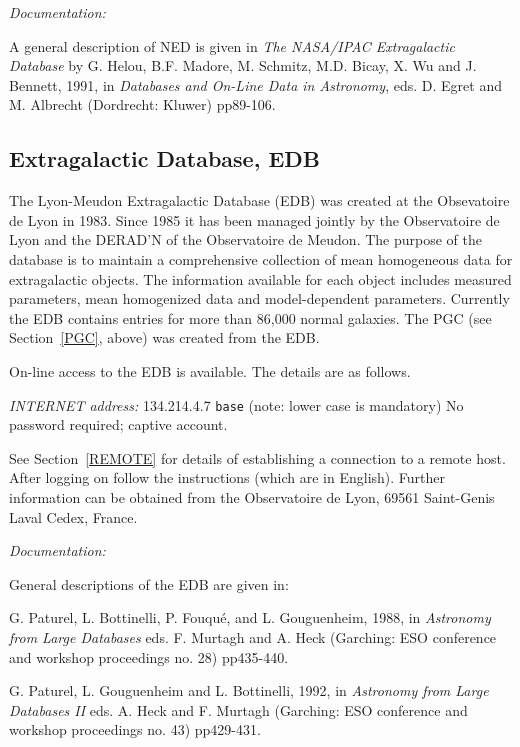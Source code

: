 {\it Documentation:}

A general description of NED is given in {\it The NASA/IPAC 
Extragalactic Database} by G. Helou, B.F. Madore, M. Schmitz, M.D. 
Bicay, X. Wu and J. Bennett, 1991, in {\it Databases and On-Line Data in
Astronomy}, eds. D. Egret and M. Albrecht (Dordrecht: Kluwer) pp89-106.

\subsection{Extragalactic Database, EDB
\label{EDB}}

The Lyon-Meudon Extragalactic Database (EDB) was created at the 
Obsevatoire de Lyon in 1983. Since 1985 it has been managed jointly by 
the Observatoire de Lyon and the DERAD'N of the Observatoire de Meudon.
The purpose of the database is to maintain a comprehensive collection
of mean homogeneous data for extragalactic objects. The information 
available for each object includes measured parameters, mean homogenized
data and model-dependent parameters. Currently the EDB contains entries
for more than 86,000 normal galaxies. The PGC (see Section~\ref{PGC},
above) was created from the EDB.

On-line access to the EDB is available. The details are as follows.

{\it INTERNET address:} 134.214.4.7
 \verb-base- (note: lower case is mandatory) 
 No password required; captive account.

See Section~\ref{REMOTE} for details of establishing a connection to
a remote host. After logging on follow the instructions (which are in
English). Further information can be obtained from the Observatoire de 
Lyon, 69561 Saint-Genis Laval Cedex, France.

{\it Documentation:}

General descriptions of the EDB are given in:

G. Paturel, L. Bottinelli, P. Fouqu\'{e}, and L. Gouguenheim, 1988, in 
{\it Astronomy from Large Databases} eds. F. Murtagh and A. Heck 
(Garching: ESO conference and workshop proceedings no. 28) pp435-440.

G. Paturel, L. Gouguenheim and L. Bottinelli, 1992, in 
{\it Astronomy from Large Databases II} eds. A. Heck and F. Murtagh
(Garching: ESO conference and workshop proceedings no. 43) pp429-431.


